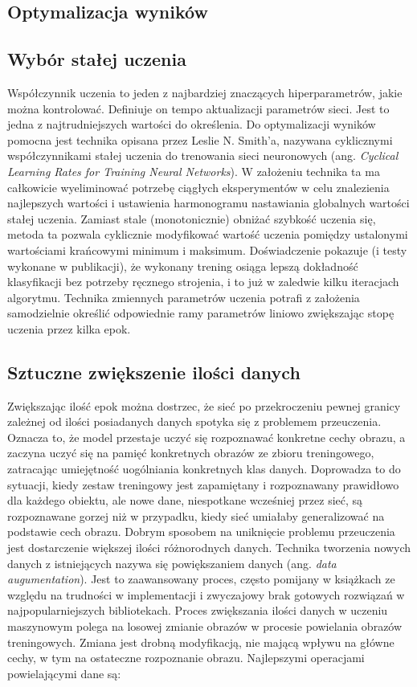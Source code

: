 \documentclass[12pt,a4paper,twoside,titlepage,openright]{book}
\begin{document}
\begin{itemize}
\section{Optymalizacja wyników}
\subsection{Wybór stałej uczenia}
Współczynnik uczenia to jeden z najbardziej znaczących hiperparametrów, jakie można kontrolować. Definiuje on tempo aktualizacji parametrów sieci. Jest to jedna z najtrudniejszych wartości do określenia. Do optymalizacji wyników pomocna jest technika opisana przez Leslie N. Smith’a, nazywana cyklicznymi współczynnikami stałej uczenia do trenowania sieci neuronowych (ang. \textit{Cyclical Learning Rates for Training Neural Networks}). W założeniu technika ta ma całkowicie wyeliminować potrzebę ciągłych eksperymentów w celu znalezienia najlepszych wartości i ustawienia harmonogramu nastawiania globalnych wartości stałej uczenia. Zamiast stale (monotonicznie) obniżać szybkość uczenia się, metoda ta pozwala cyklicznie modyfikować wartość uczenia pomiędzy ustalonymi wartościami krańcowymi minimum i maksimum. Doświadczenie pokazuje (i testy wykonane w publikacji), że wykonany trening osiąga lepszą dokładność klasyfikacji bez potrzeby ręcznego strojenia, i to już w zaledwie kilku iteracjach algorytmu. Technika zmiennych parametrów uczenia potrafi z założenia samodzielnie określić odpowiednie ramy parametrów liniowo zwiększając stopę uczenia przez kilka epok. \cite{DBLP:journals/corr/Smith15a}

\subsection{Sztuczne zwiększenie ilości danych}
Zwiększając ilość epok można dostrzec, że sieć po przekroczeniu pewnej granicy zależnej od ilości posiadanych danych spotyka się z problemem przeuczenia. Oznacza to, że model przestaje uczyć się rozpoznawać konkretne cechy obrazu, a zaczyna uczyć się na pamięć konkretnych obrazów ze zbioru treningowego, zatracając umiejętność uogólniania konkretnych klas danych. Doprowadza to do sytuacji, kiedy zestaw treningowy jest zapamiętany i rozpoznawany prawidłowo dla każdego obiektu, ale nowe dane, niespotkane wcześniej przez sieć, są rozpoznawane gorzej niż w przypadku, kiedy sieć umiałaby generalizować na podstawie cech obrazu.
Dobrym sposobem na uniknięcie problemu przeuczenia jest dostarczenie większej ilości różnorodnych danych. Technika tworzenia nowych danych z istniejących nazywa się powiększaniem danych (ang. \textit{data augumentation}). Jest to zaawansowany proces, często pomijany w książkach ze względu na trudności w implementacji i zwyczajowy brak gotowych rozwiązań w najpopularniejszych bibliotekach. 
Proces zwiększania ilości danych w uczeniu maszynowym polega na losowej zmianie obrazów w procesie powielania obrazów treningowych. Zmiana jest drobną modyfikacją, nie mającą wpływu na główne cechy, w tym na ostateczne rozpoznanie obrazu. Najlepszymi operacjami powielającymi dane są:


\end{itemize}
\end{document}
